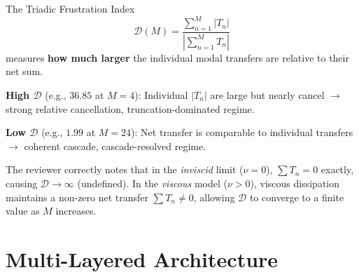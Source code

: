 \documentclass[11pt,a4paper,twoside]{article}
\newcommand{\DM}{\mathcal{D}(M)}
\newcommand{\abs}[1]{\left|#1\right|}
\begin{document}
\begin{peerreview}[title={PR1-\S1B: Corrected Interpretation}]
The Triadic Frustration Index
\begin{equation}
\DM = \frac{\sum_{n=1}^{M} |T_n|}{\abs{\sum_{n=1}^{M} T_n}}
\label{eq:frustration}
\end{equation}
measures \textbf{how much larger} the individual modal transfers are relative to their net sum.

\textbf{High $\mathcal{D}$} (e.g., $36.85$ at $M=4$): Individual $|T_n|$ are large but nearly cancel $\to$ strong relative cancellation, truncation-dominated regime.

\textbf{Low $\mathcal{D}$} (e.g., $1.99$ at $M=24$): Net transfer is comparable to individual transfers $\to$ coherent cascade, cascade-resolved regime.

The reviewer correctly notes that in the \emph{inviscid} limit ($\nu=0$), $\sum T_n = 0$ exactly, causing $\mathcal{D} \to \infty$ (undefined). In the \emph{viscous} model ($\nu > 0$), viscous dissipation maintains a non-zero net transfer $\sum T_n \neq 0$, allowing $\mathcal{D}$ to converge to a finite value as $M$ increases.
\end{peerreview}

\section{Multi-Layered Architecture}
\label{sec:architecture}
\end{document}
